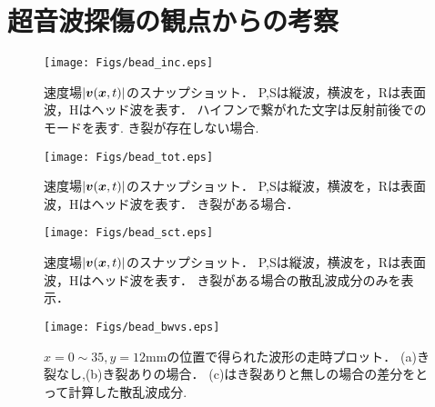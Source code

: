 \chapter{超音波探傷の観点からの考察}
\begin{figure}[h]
	\begin{center}
	\texttt{[image: Figs/bead\_inc.eps]} 
	\end{center}
	\caption{
		速度場$|\mbox{\boldmath $v$}(\mbox{\boldmath $x$},t)|$のスナップショット．
		P,Sは縦波，横波を，Rは表面波，Hはヘッド波を表す．
		ハイフンで繋がれた文字は反射前後でのモードを表す. き裂が存在しない場合.
	} 
	\label{fig:fig4_1}
\end{figure}
\begin{figure}[h]
	\begin{center}
	\texttt{[image: Figs/bead\_tot.eps]} 
	\end{center}
	\caption{
		速度場$|\mbox{\boldmath $v$}(\mbox{\boldmath $x$},t)|$のスナップショット．
		P,Sは縦波，横波を，Rは表面波，Hはヘッド波を表す．
		き裂がある場合．
	} 
	\label{fig:fig4_2}
\end{figure}
\begin{figure}[h]
	\begin{center}
	\texttt{[image: Figs/bead\_sct.eps]} 
	\end{center}
	\caption{
		速度場$|\mbox{\boldmath $v$}(\mbox{\boldmath $x$},t)|$のスナップショット．
		P,Sは縦波，横波を，Rは表面波，Hはヘッド波を表す．
		き裂がある場合の散乱波成分のみを表示．
	} 
	\label{fig:fig4_3}
\end{figure}
\begin{figure}[h]
	\begin{center}
	\texttt{[image: Figs/bead\_bwvs.eps]} 
	\end{center}
	\caption{
		$x=0\sim35, y=12$mmの位置で得られた波形の走時プロット．
		(a)き裂なし,(b)き裂ありの場合．
		(c)はき裂ありと無しの場合の差分をとって計算した散乱波成分.
	} 
	\label{fig:fig4_4}
\end{figure}


